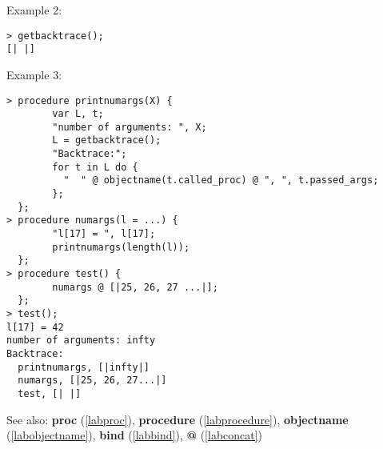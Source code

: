 \noindent Example 2: 
\begin{center}\begin{minipage}{15cm}\begin{Verbatim}[frame=single,commandchars=\\\|\~]
> getbacktrace();
[| |]
\end{Verbatim}
\end{minipage}\end{center}
\noindent Example 3: 
\begin{center}\begin{minipage}{15cm}\begin{Verbatim}[frame=single,commandchars=\\\|\~]
> procedure printnumargs(X) {
        var L, t;
        "number of arguments: ", X;
        L = getbacktrace();
        "Backtrace:";
        for t in L do {
          "  " @ objectname(t.called_proc) @ ", ", t.passed_args;
        };
  };
> procedure numargs(l = ...) {
        "l[17] = ", l[17];
        printnumargs(length(l));
  };
> procedure test() {
        numargs @ [|25, 26, 27 ...|];
  };
> test();
l[17] = 42
number of arguments: infty
Backtrace:
  printnumargs, [|infty|]
  numargs, [|25, 26, 27...|]
  test, [| |]
\end{Verbatim}
\end{minipage}\end{center}
See also: \textbf{proc} (\ref{labproc}), \textbf{procedure} (\ref{labprocedure}), \textbf{objectname} (\ref{labobjectname}), \textbf{bind} (\ref{labbind}), \textbf{@} (\ref{labconcat})
